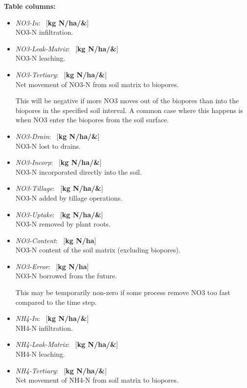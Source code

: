 \documentclass[a4paper]{article}
\begin{document}
\textbf{Table columns:}\begin{itemize}
\item \textit{NO3-In}: ~$[$\textbf{kg N/ha/\&}$]$\\
NO3-N infiltration.
\item \textit{NO3-Leak-Matrix}: ~$[$\textbf{kg N/ha/\&}$]$\\
NO3-N leaching.
\item \textit{NO3-Tertiary}: ~$[$\textbf{kg N/ha/\&}$]$\\
Net movement of NO3-N from soil matrix to biopores.

This will be negative if more NO3 moves out of the biopores than
into the biopores in the specified soil interval.  A common case
where this happens is when NO3 enter the biopores from the soil
surface.
\item \textit{NO3-Drain}: ~$[$\textbf{kg N/ha/\&}$]$\\
NO3-N lost to drains.
\item \textit{NO3-Incorp}: ~$[$\textbf{kg N/ha/\&}$]$\\
NO3-N incorporated directly into the soil.
\item \textit{NO3-Tillage}: ~$[$\textbf{kg N/ha/\&}$]$\\
NO3-N added by tillage operations.
\item \textit{NO3-Uptake}: ~$[$\textbf{kg N/ha/\&}$]$\\
NO3-N removed by plant roots.
\item \textit{NO3-Content}: ~$[$\textbf{kg N/ha}$]$\\
NO3-N content of the soil matrix (excluding biopores).
\item \textit{NO3-Error}: ~$[$\textbf{kg N/ha}$]$\\
NO3-N borrowed from the future.  

This may be temporarily non-zero if some process remove NO3 too
fast compared to the time step.
\item \textit{NH4-In}: ~$[$\textbf{kg N/ha/\&}$]$\\
NH4-N infiltration.
\item \textit{NH4-Leak-Matrix}: ~$[$\textbf{kg N/ha/\&}$]$\\
NH4-N leaching.
\item \textit{NH4-Tertiary}: ~$[$\textbf{kg N/ha/\&}$]$\\
Net movement of NH4-N from soil matrix to biopores.


\end{itemize}
\end{document}
